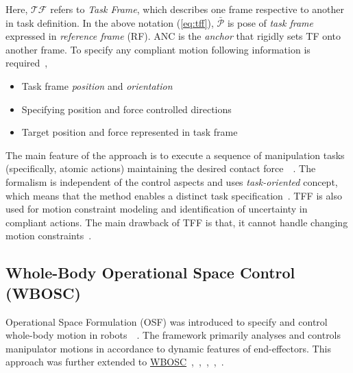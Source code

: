 Here, $\mathcal{TF}$ refers to \textit{Task Frame}, which describes one frame respective to another in task definition. In the above notation (\ref{eq:tff}), $\bar{\mathcal{P}}$ is pose of \textit{task frame} expressed in \textit{reference frame} (RF). ANC is the \textit{anchor} that rigidly sets TF onto another frame. To specify any compliant motion following information is required~\cite{de1988compliant},
\begin{itemize}
	\item Task frame \textit{position} and \textit{orientation}
	\item Specifying position and force controlled directions
	\item Target position and force represented in task frame
\end{itemize}

The main feature of the approach is to execute a sequence of manipulation tasks (specifically, atomic actions) maintaining the desired contact force~\cite{mason1981compliance}~\cite{doi:10.1177/027836498800700402}. The formalism is independent of the control aspects and uses \textit{task-oriented} concept, which means that the method enables a distinct task specification~\cite{bruyninckx1996specification}. TFF is also used for motion constraint modeling and identification of uncertainty in compliant actions. The main drawback of TFF is that, it cannot handle changing motion constraints~\cite{bruyninckx1995kinematic}. 



\subsection{Whole-Body Operational Space Control (WBOSC)}

Operational Space Formulation (OSF) was introduced to specify and control whole-body motion in robots~\cite{khatib1987unified}~\cite{khatib1987optimization}. The framework primarily analyses and controls manipulator motions in accordance to dynamic features of end-effectors. This approach was further extended to \hyperref[wbosc]{WBOSC}~\cite{khatib2004whole},~\cite{chang2000operational},~\cite{sentis2006whole},~\cite{sentis2005synthesis},~\cite{khatib2008unified}.

